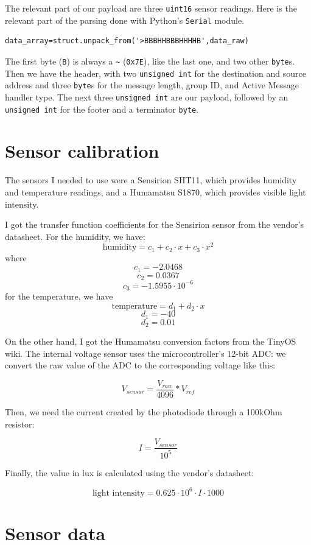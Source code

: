 \documentclass[11pt]{article}
\begin{document}
The relevant part of our payload are three \texttt{uint16} sensor readings. Here is the relevant part of the parsing done with Python's \texttt{Serial} module.

\begin{lstlisting}
data_array=struct.unpack_from('>BBBHHBBBHHHHB',data_raw)
\end{lstlisting}

The first byte (\texttt{B}) is always a \texttt{\~} (\texttt{0x7E}), like the last one, and two other \texttt{byte}s. Then we have the header, with two \texttt{unsigned int} for the destination and source address and three \texttt{byte}s for the message length, group ID, and Active Message handler type. The next three \texttt{unsigned int} are our payload, followed by an \texttt{unsigned int} for the footer and a terminator \texttt{byte}.

\section{Sensor calibration}
The sensors I needed to use were a Sensirion SHT11, which provides humidity and temperature readings, and a Humamatsu S1870, which provides visible light intensity. 

I got the transfer function coefficients for the Sensirion sensor from the vendor's datasheet. For the humidity, we have:
$$\text{humidity}=c_1+c_2\cdot x +c_3\cdot x^2$$
where
$$c_1= -2.0468$$
$$c_2=  0.0367$$
$$c_3= -1.5955\cdot10^{-6}$$
for the temperature, we have
$$\text{temperature}=d_1+d_2\cdot x$$ 
$$d_1= -40$$
$$d_2=  0.01$$

On the other hand, I got the Humamatsu conversion factors from the TinyOS wiki. The internal voltage sensor uses the microcontroller's 12-bit ADC: we convert the raw value of the ADC to the corresponding voltage like this:

$$ V_{sensor}=\frac{V_{raw}}{4096} * V_{ref} $$ 

Then, we need the current created by the photodiode through a 100kOhm resistor:

$$I = \frac{ V_{sensor} }{10^5}$$

Finally, the value in lux is calculated using the vendor's datasheet: 

$$\text{light intensity} = 0.625\cdot10^6 \cdot I \cdot 1000$$
  

\section{Sensor data}
\end{document}
